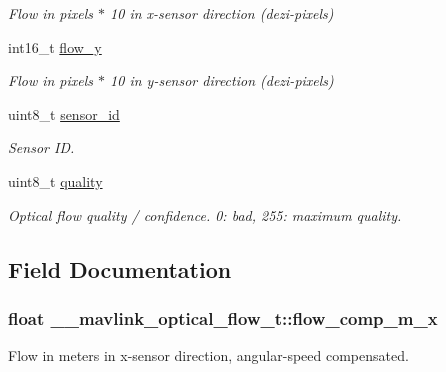 \begin{DoxyCompactItemize}
\begin{DoxyCompactList}\small\item\em Flow in pixels $\ast$ 10 in x-\/sensor direction (dezi-\/pixels) \end{DoxyCompactList}\item 
int16\+\_\+t \hyperlink{struct____mavlink__optical__flow__t_aaf2884728b3ae06ec464c9cf2f8ce1c2}{flow\+\_\+y}
\begin{DoxyCompactList}\small\item\em Flow in pixels $\ast$ 10 in y-\/sensor direction (dezi-\/pixels) \end{DoxyCompactList}\item 
uint8\+\_\+t \hyperlink{struct____mavlink__optical__flow__t_a196e345c474b8fc63570ebad5f947544}{sensor\+\_\+id}
\begin{DoxyCompactList}\small\item\em Sensor I\+D. \end{DoxyCompactList}\item 
uint8\+\_\+t \hyperlink{struct____mavlink__optical__flow__t_a3efb901fe9c47c88f90ddfb73d76f542}{quality}
\begin{DoxyCompactList}\small\item\em Optical flow quality / confidence. 0\+: bad, 255\+: maximum quality. \end{DoxyCompactList}\end{DoxyCompactItemize}


\subsection{Field Documentation}
\hypertarget{struct____mavlink__optical__flow__t_ab8fab603e276328627e4d96cc4f8b086}{
\subsubsection[{flow\+\_\+comp\+\_\+m\+\_\+x}]{\setlength{\rightskip}{0pt plus 5cm}float \+\_\+\+\_\+mavlink\+\_\+optical\+\_\+flow\+\_\+t\+::flow\+\_\+comp\+\_\+m\+\_\+x}}\label{struct____mavlink__optical__flow__t_ab8fab603e276328627e4d96cc4f8b086}


Flow in meters in x-\/sensor direction, angular-\/speed compensated. 

